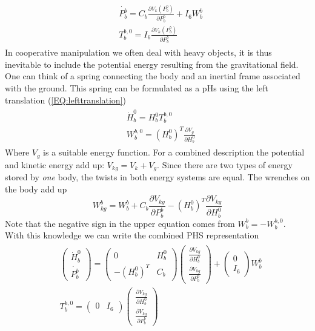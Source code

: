\documentclass[a4paper,twoside, openright,12pt]{report}
\begin{document}
\begin{eqnarray}\label{EQ:PHSsimpleinertia}
\begin{aligned}
	&\dot{P_b^b} = C_b \frac{\partial V_k(P_b^b)}{\partial P_b^b} + I_6 W_{b}^b \\
	&T_b^{b,0} = I_6 \frac{\partial V_k(P_b^b)}{\partial P_b^b}
\end{aligned}
\end{eqnarray}
In cooperative manipulation we often deal with heavy objects, it is thus inevitable to include the potential energy resulting from the gravitational field. One can think of a spring connecting the body and an inertial frame associated with the ground. This spring can be formulated as a pHs using the left translation (\ref{EQ:lefttranslation})
\begin{eqnarray}\label{EQ:gravityspring}
\begin{aligned}
	&\dot{H}_b^0 = H_b^0 T_b^{b,0}\\
	&W_b^{b,0} = (H_b^0)^T\frac{\partial V_{g}}{\partial H_b^0}
\end{aligned}
\end{eqnarray}
Where $V_g$ is a suitable energy function. For a combined description the potential and kinetic energy add up: $V_{kg} = V_k + V_g$. Since there are two types of energy stored by \emph{one} body, the twists in both energy systems are equal. The wrenches on the body add up   
\[W_{kg}^b = W_{b}^b + C_b \frac{\partial V_{kg}}{\partial P_b^b} - (H_b^0)^T \frac{\partial V_{kg}}{\partial H_b^0} \]
Note that the negative sign in the upper equation comes from $W_b^b = - W_b^{b,0} $.\\
With this knowledge we can write the combined PHS representation
\begin{eqnarray} \label{EQ:PHSinertia}
\begin{aligned}
&\begin{pmatrix}\dot{H}_b^0 \\ \dot{P_b^b}\end{pmatrix} =
\begin{pmatrix} 0 & H_b^0  \\
- (H_b^0)^T & C_b\end{pmatrix}
\begin{pmatrix}\frac{\partial V_{kg}}{\partial H_b^0} \\ \frac{\partial V_{kg}}{\partial P_b^b}\end{pmatrix}+
\begin{pmatrix}0 \\ I_6\end{pmatrix} W_{b}^b \\
&T_b^{b,0} = \begin{pmatrix}0 & I_6\end{pmatrix}
\begin{pmatrix}\frac{\partial V_{kg}}{\partial H_b^0} \\ \frac{\partial V_{kg}}{\partial P_b^b}\end{pmatrix}
\end{aligned}
\end{eqnarray}
\end{document}
